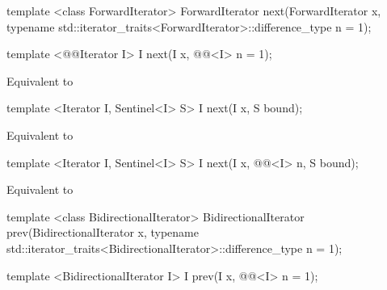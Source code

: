 %
\begin{removedblock}
\begin{itemdecl}
template <class ForwardIterator>
  ForwardIterator next(ForwardIterator x,
    typename std::iterator_traits<ForwardIterator>::difference_type n = 1);
\end{itemdecl}
\end{removedblock}
\begin{addedblock}
\begin{itemdecl}
template <@@Iterator I>
  I next(I x, @@<I> n = 1);
\end{itemdecl}
\end{addedblock}

\begin{itemdescr}
\pnum
\effects Equivalent to 
\end{itemdescr}

\begin{addedblock}
\begin{itemdecl}
template <Iterator I, Sentinel<I> S>
  I next(I x, S bound);
\end{itemdecl}

\begin{itemdescr}
\pnum
\effects Equivalent to 
\end{itemdescr}

\begin{itemdecl}
template <Iterator I, Sentinel<I> S>
  I next(I x, @@<I> n, S bound);
\end{itemdecl}

\begin{itemdescr}
\pnum
\effects Equivalent to 
\end{itemdescr}
\end{addedblock}

%
\begin{removedblock}
\begin{itemdecl}
template <class BidirectionalIterator>
  BidirectionalIterator prev(BidirectionalIterator x,
    typename std::iterator_traits<BidirectionalIterator>::difference_type n = 1);
\end{itemdecl}
\end{removedblock}
\begin{addedblock}
\begin{itemdecl}
template <BidirectionalIterator I>
  I prev(I x, @@<I> n = 1);
\end{itemdecl}
\end{addedblock}

